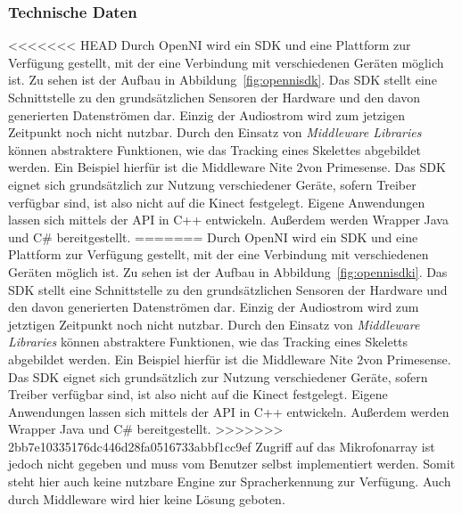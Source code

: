 
\subsubsection{Technische Daten}

<<<<<<< HEAD
Durch OpenNI wird ein SDK und eine Plattform zur Verf\"ugung gestellt, mit der eine Verbindung mit verschiedenen Ger\"aten m\"oglich ist. Zu sehen ist der Aufbau in Abbildung~\ref{fig:opennisdk}.
Das SDK stellt eine Schnittstelle zu den grunds\"atzlichen Sensoren der Hardware und den davon generierten Datenstr\"omen dar.
Einzig der Audiostrom wird zum jetzigen Zeitpunkt noch nicht nutzbar.
Durch den Einsatz von \textit{Middleware Libraries} k\"onnen abstraktere Funktionen, wie das Tracking eines Skelettes abgebildet werden. Ein Beispiel 
hierf\"ur ist die Middleware Nite 2\footnotemark[10] von Primesense. Das SDK eignet sich grunds\"atzlich zur Nutzung verschiedener Ger\"ate, 
sofern Treiber verf\"ugbar sind, ist also nicht auf die Kinect festgelegt.
Eigene Anwendungen lassen sich mittels der API in C++ entwickeln. Außerdem werden \gls{Wrapper} Java und C\# bereitgestellt.
=======
Durch OpenNI wird ein SDK und eine Plattform zur Verf\"ugung gestellt, mit der eine Verbindung mit verschiedenen Ger\"aten m\"oglich ist. Zu sehen ist der Aufbau in Abbildung~\ref{fig:opennisdki}.
Das SDK stellt eine Schnittstelle zu den grunds\"atzlichen Sensoren der Hardware und den davon generierten Datenstr\"omen dar.
Einzig der Audiostrom wird zum jetztigen Zeitpunkt noch nicht nutzbar.
Durch den Einsatz von \textit{Middleware Libraries} k\"onnen abstraktere Funktionen, wie das Tracking eines Skeletts abgebildet werden. Ein Beispiel 
hierf\"ur ist die Middleware Nite 2\footnotemark[10] von Primesense. Das SDK eignet sich grunds\"atzlich zur Nutzung verschiedener Ger\"ate, 
sofern Treiber verf\"ugbar sind, ist also nicht auf die Kinect festgelegt.
Eigene Anwendungen lassen sich mittels der API in C++ entwickeln. Außerdem werden Wrapper Java und C\# bereitgestellt.
>>>>>>> 2bb7e10335176dc446d28fa0516733abbf1cc9ef
Zugriff auf das Mikrofonarray ist jedoch nicht gegeben und muss vom Benutzer selbst implementiert werden. 
Somit steht hier auch keine nutzbare Engine zur Spracherkennung zur Verf\"ugung.
Auch durch Middleware wird hier keine L\"osung geboten.

